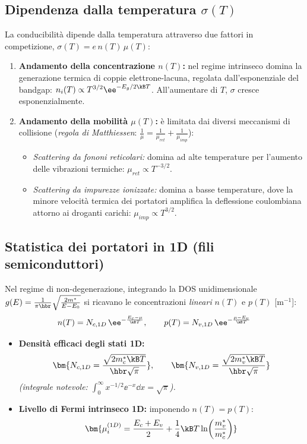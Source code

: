 \subsection{Dipendenza dalla temperatura $\sigma(T)$}
La conducibilità dipende dalla temperatura attraverso due fattori in competizione, $\sigma(T)=e\,n(T)\,\mu(T)$:
\begin{enumerate}
\item \textbf{Andamento della concentrazione $n(T)$:} nel regime intrinseco domina la generazione termica di coppie elettrone-lacuna, regolata dall'esponenziale del bandgap: $n_i(T)\propto T^{3/2}\ee^{-E_g/2\kB T}$. All'aumentare di $T$, $\sigma$ cresce esponenzialmente.
\item \textbf{Andamento della mobilità $\mu(T)$:} è limitata dai diversi meccanismi di collisione (\textit{regola di Matthiessen}: $\frac{1}{\mu}=\frac{1}{\mu_{ret}}+\frac{1}{\mu_{imp}}$):
\begin{itemize}
\item \textit{Scattering da fononi reticolari:} domina ad alte temperature per l'aumento delle vibrazioni termiche: $\mu_{ret}\propto T^{-3/2}$.
\item \textit{Scattering da impurezze ionizzate:} domina a basse temperature, dove la minore velocità termica dei portatori amplifica la deflessione coulombiana attorno ai droganti carichi: $\mu_{imp}\propto T^{3/2}$.
\end{itemize}
\end{enumerate}


\subsection{Statistica dei portatori in 1D (fili semiconduttori)}
Nel regime di non-degenerazione, integrando la DOS unidimensionale $g(E)=\frac{1}{\pi\hbr}\sqrt{\frac{2m^*}{E-E_0}}$ si ricavano le concentrazioni \emph{lineari} $n(T)$ e $p(T)$ [m$^{-1}$]:
\[ n(T) = N_{c,1D}\,\ee^{-\frac{E_c-\mu}{\kB T}}, \qquad p(T) = N_{v,1D}\,\ee^{-\frac{\mu-E_v}{\kB T}} \]
\begin{itemize}
    \setlength{\itemsep}{1pt}
    \item \textbf{Densità efficaci degli stati 1D:}
    \[ \bm{N_{c,1D} = \frac{\sqrt{2m_c^*\kB T}}{\hbr\sqrt{\pi}}}, \qquad \bm{N_{v,1D} = \frac{\sqrt{2m_v^*\kB T}}{\hbr\sqrt{\pi}}} \]
    \textit{(integrale notevole: $\int_0^\infty x^{-1/2}\ee^{-x}\dd x=\sqrt\pi$).}
    \item \textbf{Livello di Fermi intrinseco 1D:} imponendo $n(T)=p(T)$:
    \[ \bm{\mu_i^{(1D)} = \frac{E_c+E_v}{2}+\frac14\kB T\ln\!\left(\frac{m_v^*}{m_c^*}\right)} \]
\end{itemize}




